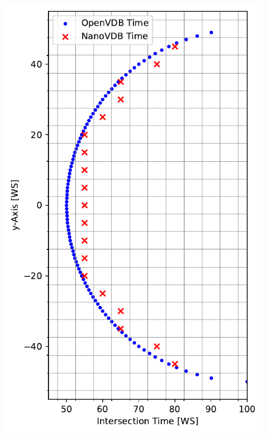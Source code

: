 \begin{figure}[h]
	\includegraphics[width=\linewidth]{res/intersection_time.pdf}
	\endminipage\hfill

\end{figure}
